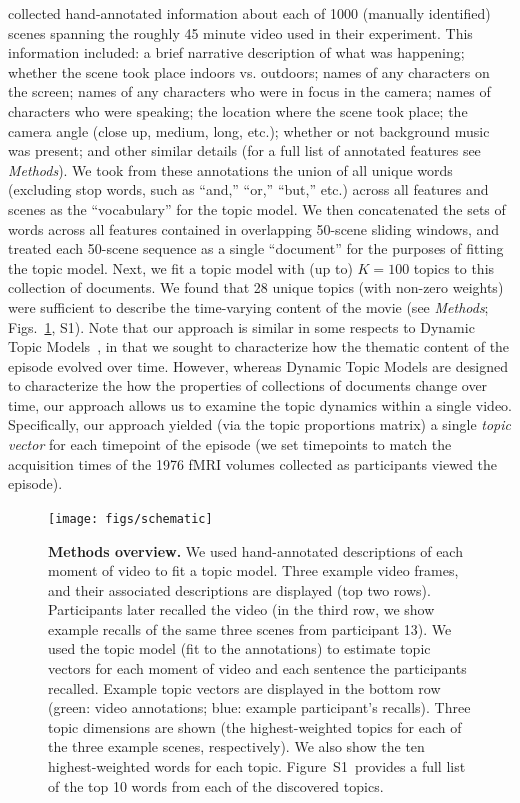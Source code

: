 \documentclass{article}
\newcommand{\topics}{S1}
\begin{document}
\cite{ChenEtal17} collected hand-annotated information about each of 1000 (manually identified) scenes spanning the roughly 45 minute video used in their experiment.  This information included: a brief narrative description of what was happening; whether the scene took place indoors vs. outdoors; names of any characters on the screen; names of any characters who were in focus in the camera; names of characters who were speaking; the location where the scene took place; the camera angle (close up, medium, long, etc.); whether or not background music was present; and other similar details (for a full list of annotated features see \textit{Methods}).  We took from these annotations the union of all unique words (excluding stop words, such as ``and,'' ``or,'' ``but,'' etc.) across all features and scenes as the ``vocabulary'' for the topic model.  We then concatenated the sets of words across all features contained in overlapping 50-scene sliding windows, and treated each 50-scene sequence as a single ``document'' for the purposes of fitting the topic model.  Next, we fit a topic model with (up to) $K = 100$ topics to this collection of documents.  We found that 28 unique topics (with non-zero weights) were sufficient to describe the time-varying content of the movie (see \textit{Methods}; Figs.~\ref{fig:schematic}, \topics).  Note that our approach is similar in some respects to Dynamic Topic Models~\citep{BleiLaff06}, in that we sought to characterize how the thematic content of the episode evolved over time.  However, whereas Dynamic Topic Models are designed to characterize the how the properties of collections of documents change over time, our approach allows us to examine the topic dynamics within a single video.  Specifically, our approach yielded (via the topic proportions matrix) a single \textit{topic vector} for each timepoint of the episode (we set timepoints to match the acquisition times of the 1976 fMRI volumes collected as participants viewed the episode).

\begin{figure}[tp]
\centering
\texttt{[image: figs/schematic]}
\caption{\small \textbf{Methods overview.} We used hand-annotated descriptions of each moment of video to fit a topic model.  Three example video frames, and their associated descriptions are displayed (top two rows).  Participants later recalled the video (in the third row, we show example recalls of the same three scenes from participant 13).  We used the topic model (fit to the annotations) to estimate topic vectors for each moment of video and each sentence the participants recalled.  Example topic vectors are displayed in the bottom row (green: video annotations; blue: example participant's recalls).  Three topic dimensions are shown (the highest-weighted topics for each of the three example scenes, respectively).  We also show the ten highest-weighted words for each topic.  Figure~\topics~provides a full list of the top 10 words from each of the discovered topics.}
\label{fig:schematic}
\end{figure}
\end{document}
